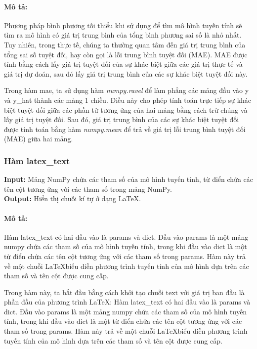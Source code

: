 \documentclass[]{article}
\begin{document}
\paragraph{Mô tả:}

Phương pháp bình phương tối thiểu khi sử dụng để tìm mô hình tuyến tính sẽ tìm ra mô hình có giá trị trung bình của tổng bình phương sai số là nhỏ nhất.  Tuy nhiên, trong thực tế, chúng ta thường quan tâm đến giá trị trung bình của tổng sai số tuyệt đối, hay còn gọi là lỗi trung bình tuyệt đối (MAE). MAE được tính bằng cách lấy giá trị tuyệt đối của sự khác biệt giữa các giá trị thực tế và giá trị dự đoán, sau đó lấy giá trị trung bình của các sự khác biệt tuyệt đối này.

Trong hàm mae, ta sử dụng hàm \textit{numpy.ravel} để làm phẳng các mảng đầu vào y và y\_hat thành các mảng 1 chiều. Điều này cho phép tính toán trực tiếp sự khác biệt tuyệt đối giữa các phần tử tương ứng của hai mảng bằng cách trừ chúng và lấy giá trị tuyệt đối. Sau đó, giá trị trung bình của các sự khác biệt tuyệt đối được tính toán bằng hàm \textit{numpy.mean} để trả về giá trị lỗi trung bình tuyệt đối (MAE) giữa hai mảng.

\subsubsection{Hàm latex\_text}
\noindent
\textbf{Input:} Mảng NumPy chứa các tham số của mô hình tuyến tính, từ điển chứa các tên cột tương ứng với các tham số trong mảng NumPy. \\
\textbf{Output:} Hiển thị chuỗi kí tự ở dạng \LaTeX.
\paragraph{Mô tả:}

Hàm latex\_text có hai đầu vào là params và dict. Đầu vào params là một mảng numpy chứa các tham số của mô hình tuyến tính, trong khi đầu vào dict là một từ điển chứa các tên cột tương ứng với các tham số trong params. Hàm này trả về một chuỗi \LaTeX \space biểu diễn phương trình tuyến tính của mô hình dựa trên các tham số và tên cột được cung cấp.

Trong hàm này, ta bắt đầu bằng cách khởi tạo chuỗi text với giá trị ban đầu là phần đầu của phương trình \LaTeX: Hàm latex\_text có hai đầu vào là params và dict. Đầu vào params là một mảng numpy chứa các tham số của mô hình tuyến tính, trong khi đầu vào dict là một từ điển chứa các tên cột tương ứng với các tham số trong params. Hàm này trả về một chuỗi \LaTeX \space biểu diễn phương trình tuyến tính của mô hình dựa trên các tham số và tên cột được cung cấp.
\end{document}
